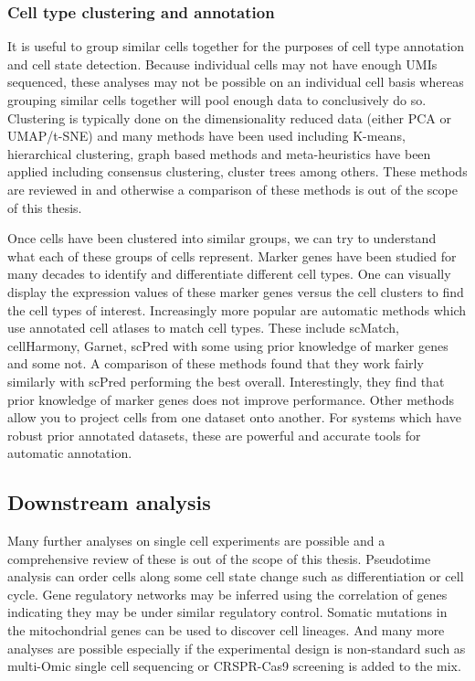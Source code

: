 \subsubsection{Cell type clustering and annotation}

\par{
It is useful to group similar cells together for the purposes of cell type annotation and cell state detection. Because individual cells may not have enough UMIs sequenced, these analyses may not be possible on an individual cell basis whereas grouping similar cells together will pool enough data to conclusively do so. Clustering is typically done on the dimensionality reduced data (either PCA or UMAP/t-SNE) and many methods have been used including K-means, hierarchical clustering, graph based methods and meta-heuristics have been applied including consensus clustering, cluster trees among others\cite{scclustreview}\cite{subpop}\cite{sc3}\cite{clustree}. These methods are reviewed in \cite{scclustreview} and otherwise a comparison of these methods is out of the scope of this thesis.
} 

\par{
Once cells have been clustered into similar groups, we can try to understand what each of these groups of cells represent. Marker genes have been studied for many decades to identify and differentiate different cell types. One can visually display the expression values of these marker genes versus the cell clusters to find the cell types of interest. Increasingly more popular are automatic methods which use annotated cell atlases to match cell types. These include scMatch\cite{scMatch}, cellHarmony\cite{cellHarmony}, Garnet\cite{Garnet}, scPred\cite{scPred} with some using prior knowledge of marker genes and some not. A comparison of these methods found that they work fairly similarly with scPred performing the best overall. Interestingly, they find that prior knowledge of marker genes does not improve performance. Other methods allow you to project cells from one dataset onto another\cite{scmap}. For systems which have robust prior annotated datasets, these are powerful and accurate tools for automatic annotation.
}



\subsection{Downstream analysis}
\par{
Many further analyses on single cell experiments are possible and a comprehensive review of these is out of the scope of this thesis. Pseudotime analysis can order cells along some cell state change such as differentiation or cell cycle\cite{pseudotime}\cite{scHOT}. Gene regulatory networks may be inferred using the correlation of genes indicating they may be under similar regulatory control\cite{scenic}. Somatic mutations in the mitochondrial genes can be used to discover cell lineages\cite{lineage}. And many more analyses are possible especially if the experimental design is non-standard such as multi-Omic single cell sequencing or CRSPR-Cas9 screening\cite{perturb} is added to the mix.
}

